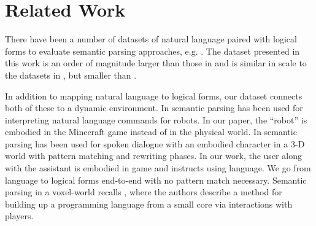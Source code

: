 \section{Related Work}



There have been a number of datasets of natural language paired with logical forms to evaluate semantic parsing approaches, e.g. \cite{price1990evaluation, tang2001using, cai2013large, wang2015building, zhong2017seq2sql}. The dataset presented in this work is an order of magnitude larger than those in \cite{price1990evaluation, tang2001using, cai2013large} and is similar in scale to the datasets in \cite{wang2015building}, but smaller than \cite{zhong2017seq2sql}. 


In addition to mapping natural language to logical forms, our dataset connects both of these to a dynamic environment.  
In \cite{lauria2001training, bos2007spoken, tellex2011understanding, matuszek2013learning, thomason2019improving} semantic parsing has been used for interpreting natural language commands for robots. %
In our paper, the ``robot'' is embodied in the Minecraft game instead of in the physical world. In \cite{Boye2006RobustSL} semantic parsing has been used for spoken dialogue with an embodied character in a 3-D world with pattern matching and rewriting phases. In our work, the user along with the assistant is embodied in game and instructs using language. We go from language to logical forms end-to-end with no pattern match necessary.
%
Semantic parsing in a voxel-world recalls \cite{wang2017naturalizing}, where the authors describe a method for building up a programming language from a small core via interactions with players.  %

